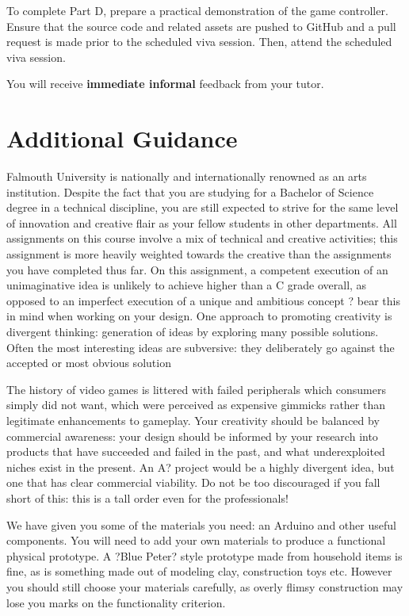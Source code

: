 \documentclass{../fal_assignment}
\begin{document}
To complete Part D, prepare a practical demonstration of the game controller. Ensure that the source code and related assets are pushed to GitHub and a pull request is made prior to the scheduled viva session. Then, attend the scheduled viva session. 

You will receive \textbf{immediate informal} feedback from your tutor.

\section*{Additional Guidance}
Falmouth University is nationally and internationally renowned as an arts institution. Despite the fact that you are studying for a Bachelor of Science degree in a technical discipline, you are still expected to strive for the same level of innovation and creative flair as your fellow students in other departments. All assignments on this course involve a mix of technical and creative activities; this assignment is more heavily weighted towards the creative than the assignments you have completed thus far. On this assignment, a competent execution of an unimaginative idea is unlikely to achieve higher than a C grade overall, as opposed to an imperfect execution of a unique and ambitious concept ? bear this in mind when working on your design. One approach to promoting creativity is divergent thinking: generation of ideas by exploring many possible solutions. Often the most interesting ideas are subversive: they deliberately go against the accepted or most obvious solution 

The history of video games is littered with failed peripherals which consumers simply did not want, which were perceived as expensive gimmicks rather than legitimate enhancements to gameplay. Your creativity should be balanced by commercial awareness: your design should be informed by your research into products that have succeeded and failed in the past, and what underexploited niches exist in the present. An A? project would be a highly divergent idea, but one that has clear commercial viability. Do not be too discouraged if you fall short of this: this is a tall order even for the professionals! 

We have given you some of the materials you need: an Arduino and other useful components. You will need to add your own materials to produce a functional physical prototype. A ?Blue Peter? style prototype made from household items is fine, as is something made out of modeling clay, construction toys etc. However you should still choose your materials carefully, as overly flimsy construction may lose you marks on the functionality criterion. 
\end{document}
